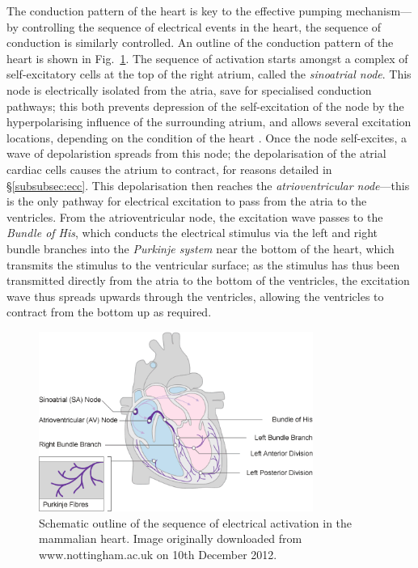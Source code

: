 \documentclass[../thesis-main.tex]{subfiles}
\begin{document}
 The conduction pattern of the heart is key to the effective pumping mechanism---by controlling the sequence of electrical events in the heart, the sequence of conduction is similarly controlled. An outline of the conduction pattern of the heart is shown in Fig.~\ref{fig:conduction-pattern}. The sequence of activation starts amongst a complex of self-excitatory cells at the top of the right atrium, called the \emph{sinoatrial node}. This node is electrically isolated from the atria, save for specialised conduction pathways; this both prevents depression of the self-excitation of the node by the hyperpolarising influence of the surrounding atrium, and allows several excitation locations, depending on the condition of the heart \citep{Fedorov2012}. Once the node self-excites, a wave of depolaristion spreads from this node; the depolarisation of the atrial cardiac cells causes the atrium to contract, for reasons detailed in \S\ref{subsubsec:ecc}. This depolarisation then reaches the \emph{atrioventricular node}---this is the only pathway for electrical excitation to pass from the atria to the ventricles. From the atrioventricular node, the excitation wave passes to the \emph{Bundle of His}, which conducts the electrical stimulus via the left and right bundle branches into the \emph{Purkinje system} near the bottom of the heart, which transmits the stimulus to the ventricular surface; as the stimulus has thus been transmitted directly from the atria to the bottom of the ventricles, the excitation wave thus spreads upwards through the ventricles, allowing the ventricles to contract from the bottom up as required.
 \begin{figure}
  \centering
  \includegraphics[width=0.8\textwidth]{cardiac_conduction}
  \caption[Pattern of electrical activation in the heart]{Schematic outline of the sequence of electrical activation in the mammalian heart. Image originally downloaded from www.nottingham.ac.uk on 10th December 2012.}
  \label{fig:conduction-pattern}
 \end{figure}
 
\end{document}
